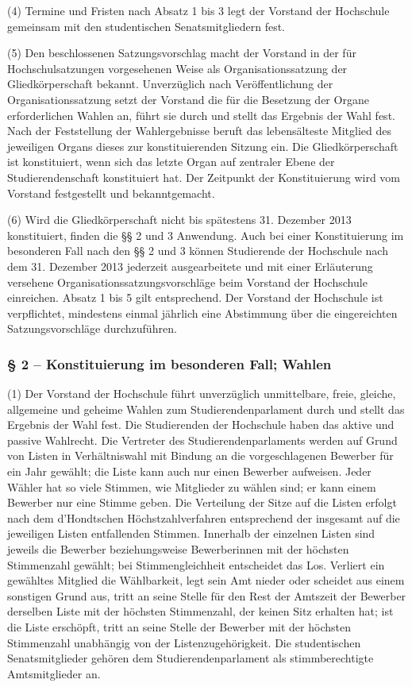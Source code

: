 \documentclass[
10pt,
a4paper,
twoside,								%
titlepage=false,							%
draft=false								%
]{scrartcl}
\begin{document}
(4) Termine und Fristen nach Absatz 1 bis 3 legt der Vorstand der Hochschule gemeinsam mit den studentischen Senatsmitgliedern fest.

(5) Den beschlossenen Satzungsvorschlag macht der Vorstand in der für Hochschulsatzungen vorgesehenen Weise als Organisationssatzung der Gliedkörperschaft bekannt. Unverzüglich nach Veröffentlichung der Organisationssatzung setzt der Vorstand die für die Besetzung der Organe erforderlichen Wahlen an, führt sie durch und stellt das Ergebnis der Wahl fest. Nach der Feststellung der Wahlergebnisse beruft das lebensälteste Mitglied des jeweiligen Organs dieses zur konstituierenden Sitzung ein. Die Gliedkörperschaft ist konstituiert, wenn sich das letzte Organ auf zentraler Ebene der Studierendenschaft konstituiert hat. Der Zeitpunkt der Konstituierung wird vom Vorstand festgestellt und bekanntgemacht.

(6) Wird die Gliedkörperschaft nicht bis spätestens 31. Dezember 2013 konstituiert, finden die §§ 2 und 3 Anwendung. Auch bei einer Konstituierung im besonderen Fall nach den §§ 2 und 3 können Studierende der Hochschule nach dem 31. Dezember 2013 jederzeit ausgearbeitete und mit einer Erläuterung versehene Organisationssatzungsvorschläge beim Vorstand der Hochschule einreichen. Absatz 1 bis 5 gilt entsprechend. Der Vorstand der Hochschule ist verpflichtet, mindestens einmal jährlich eine Abstimmung über die eingereichten Satzungsvorschläge durchzuführen.


\subsubsection*{§ 2 – Konstituierung im besonderen Fall; Wahlen}

(1) Der Vorstand der Hochschule führt unverzüglich unmittelbare, freie, gleiche, allgemeine und geheime Wahlen zum Studierendenparlament durch und stellt das Ergebnis der Wahl fest. Die Studierenden der Hochschule haben das aktive und passive Wahlrecht. Die Vertreter des Studierendenparlaments werden auf Grund von Listen in Verhältniswahl mit Bindung an die vorgeschlagenen Bewerber für ein Jahr gewählt; die Liste kann auch nur einen Bewerber aufweisen. Jeder Wähler hat so viele Stimmen, wie Mitglieder zu wählen sind; er kann einem Bewerber nur eine Stimme geben. Die Verteilung der Sitze auf die Listen erfolgt nach dem d’Hondtschen Höchstzahlverfahren entsprechend der insgesamt auf die jeweiligen Listen entfallenden Stimmen. Innerhalb der einzelnen Listen sind jeweils die Bewerber beziehungsweise Bewerberinnen mit der höchsten Stimmenzahl gewählt; bei Stimmengleichheit entscheidet das Los. Verliert ein gewähltes Mitglied die Wählbarkeit, legt sein Amt nieder oder scheidet aus einem sonstigen Grund aus, tritt an seine Stelle für den Rest der Amtszeit der Bewerber derselben Liste mit der höchsten Stimmenzahl, der keinen Sitz erhalten hat; ist die Liste erschöpft, tritt an seine Stelle der Bewerber mit der höchsten Stimmenzahl unabhängig von der Listenzugehörigkeit. Die studentischen Senatsmitglieder gehören dem Studierendenparlament als stimmberechtigte Amtsmitglieder an.
\end{document}
